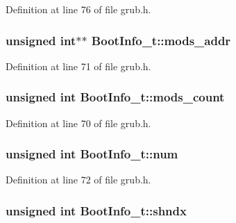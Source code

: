 Definition at line 76 of file grub.\+h.

\hypertarget{structBootInfo__t_a1be510e25cd3a21bfd0d4d3b303e0543}{
\subsubsection[{mods\+\_\+addr}]{\setlength{\rightskip}{0pt plus 5cm}unsigned int$\ast$$\ast$ Boot\+Info\+\_\+t\+::mods\+\_\+addr}}\label{structBootInfo__t_a1be510e25cd3a21bfd0d4d3b303e0543}


Definition at line 71 of file grub.\+h.

\hypertarget{structBootInfo__t_a178ef95a8fbd89ec018899b9ba241d92}{
\subsubsection[{mods\+\_\+count}]{\setlength{\rightskip}{0pt plus 5cm}unsigned int Boot\+Info\+\_\+t\+::mods\+\_\+count}}\label{structBootInfo__t_a178ef95a8fbd89ec018899b9ba241d92}


Definition at line 70 of file grub.\+h.

\hypertarget{structBootInfo__t_a6a38dc50fe6f5719f544488a265b8cf1}{
\subsubsection[{num}]{\setlength{\rightskip}{0pt plus 5cm}unsigned int Boot\+Info\+\_\+t\+::num}}\label{structBootInfo__t_a6a38dc50fe6f5719f544488a265b8cf1}


Definition at line 72 of file grub.\+h.

\hypertarget{structBootInfo__t_ab2c8b3b8778032a87c0c2fe73245e9e8}{
\subsubsection[{shndx}]{\setlength{\rightskip}{0pt plus 5cm}unsigned int Boot\+Info\+\_\+t\+::shndx}}\label{structBootInfo__t_ab2c8b3b8778032a87c0c2fe73245e9e8}


